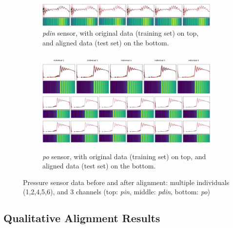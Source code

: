 \begin{figure}[!htb]
\begin{center}
\begin{subfigure}{\linewidth}
        \includegraphics[height=0.159\linewidth,trim=675 0 0 0,clip]{figures/aligned/plot_heatmap_class_1_3.jpg}
        \caption{\textit{pdin} sensor, with original data (training set) on top, and aligned data (test set) on the bottom.}
    \end{subfigure}
    \begin{subfigure}{\linewidth}
        \includegraphics[width=\linewidth]{figures/original/plot_heatmap_class_1_1.jpg}
        \includegraphics[width=\linewidth]{figures/original/plot_heatmap_class_1_4.jpg}
        \includegraphics[height=0.159\linewidth,trim=0 0 900 0,clip]{figures/aligned/plot_heatmap_class_1_4.jpg}
        \includegraphics[height=0.159\linewidth,trim=675 0 0 0,clip]{figures/aligned/plot_heatmap_class_1_4.jpg}
        \caption{\textit{po} sensor, with original data (training set) on top, and aligned data (test set) on the bottom.}
    \end{subfigure}
    \caption{Pressure sensor data before and after alignment: multiple individuals (1,2,4,5,6), and 3 channels (top: \textit{pin}, middle: \textit{pdin}, bottom: \textit{po})}
    \label{fig:phm_alignment_2}
    \end{center}
\end{figure}
\clearpage

\subsection{Qualitative Alignment Results}

